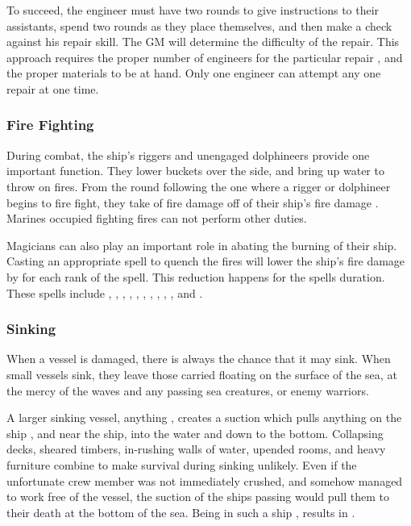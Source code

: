 \begin{multicols*}{2}
To succeed, the engineer must have two rounds to give instructions to their assistants, spend two rounds as they place themselves, and then make a check against his repair skill. The GM will determine the difficulty of the repair.  This approach requires the proper number of engineers for the particular repair , and the proper materials to be at hand. Only one engineer can attempt any one repair at one time.
\subsubsection{Fire Fighting}
During combat, the ship's riggers and unengaged dolphineers provide one important function. They lower buckets over the side, and bring up water to throw on fires.
From the round following the one where a rigger or dolphineer begins to fire fight, they take  of fire damage off of their ship's fire damage . Marines occupied fighting fires can not perform other duties.

Magicians can also play an important role in abating the burning of their ship. Casting an appropriate spell to quench the fires will lower the ship's fire damage by  for each rank of the spell. This reduction happens  for the spells duration. These spells include , , , , , , , , , , and .
\subsubsection{Sinking}
When a vessel is damaged, there is always the chance that it may sink. When small vessels sink, they leave those carried floating on the surface of the sea, at the mercy of the waves and any passing sea creatures, or enemy warriors.

A larger sinking vessel, anything , creates a suction which pulls anything on the ship , and near the ship, into the water and down to the bottom. Collapsing decks, sheared timbers, in-rushing walls of water, upended rooms, and heavy furniture combine to make survival during sinking unlikely. Even if the unfortunate crew member was not immediately crushed, and somehow managed to work free of the vessel, the suction of the ships passing would pull them to their death at the bottom of the sea. Being in such a ship , results in .


\end{multicols*}
